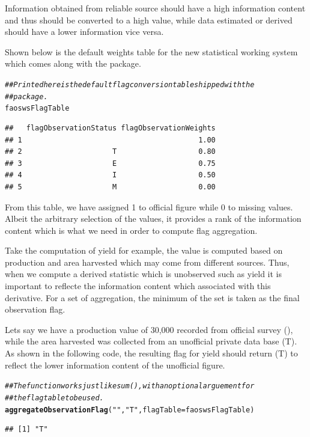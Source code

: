 \documentclass[nojss]{jss}\usepackage[]{graphicx}\usepackage[]{color}
\makeatletter
\newcommand{\hlstr}[1]{\textcolor[rgb]{0.192,0.494,0.8}{#1}}%
\newcommand{\hlcom}[1]{\textcolor[rgb]{0.678,0.584,0.686}{\textit{#1}}}%
\newcommand{\hlstd}[1]{\textcolor[rgb]{0.345,0.345,0.345}{#1}}%
\newcommand{\hlkwc}[1]{\textcolor[rgb]{0.333,0.667,0.333}{#1}}%
\newcommand{\hlkwd}[1]{\textcolor[rgb]{0.737,0.353,0.396}{\textbf{#1}}}%
\newenvironment{kframe}{%
 \def\at@end@of@kframe{}%
 \ifinner\ifhmode%
  \def\at@end@of@kframe{\end{minipage}}%
  \begin{minipage}{\columnwidth}%
 \fi\fi%
 \def\FrameCommand##1{\hskip\@totalleftmargin \hskip-\fboxsep
 \colorbox{shadecolor}{##1}\hskip-\fboxsep
     \hskip-\linewidth \hskip-\@totalleftmargin \hskip\columnwidth}%
 \MakeFramed {\advance\hsize-\width
   \@totalleftmargin\z@ \linewidth\hsize
   \@setminipage}}%
 {\par\unskip\endMakeFramed%
 \at@end@of@kframe}
\newenvironment{knitrout}{}{} %
\makeatother
\begin{document}
Information obtained from reliable source should have a high
information content and thus should be converted to a high value,
while data estimated or derived should have a lower information vice
versa.

Shown below is the default weights table for the new statistical
working system which comes along with the package.

\begin{knitrout}
\color{fgcolor}\begin{kframe}
\begin{alltt}
\hlcom{## Printed here is the default flag conversion table shipped with the}
\hlcom{## package.}
\hlstd{faoswsFlagTable}
\end{alltt}
\begin{verbatim}
##   flagObservationStatus flagObservationWeights
## 1                                         1.00
## 2                     T                   0.80
## 3                     E                   0.75
## 4                     I                   0.50
## 5                     M                   0.00
\end{verbatim}
\end{kframe}
\end{knitrout}

From this table, we have assigned 1 to official figure while 0 to
missing values. Albeit the arbitrary selection of the values, it
provides a rank of the information content which is what we need in
order to compute flag aggregation.

Take the computation of yield for example, the value is computed based
on production and area harvested which may come from different
sources. Thus, when we compute a derived statistic which is unobserved
such as yield it is important to reflecte the information content
which associated with this derivative. For a set of aggregation, the
minimum of the set is taken as the final observation flag.

Lets say we have a production value of 30,000 recorded from official
survey (), while the area harvested was collected from an unofficial
private data base (T). As shown in the following code, the resulting
flag for yield should return (T) to reflect the lower information
content of the unofficial figure.


\begin{knitrout}
\color{fgcolor}\begin{kframe}
\begin{alltt}
\hlcom{## The function works just like sum(), with an optional arguement for}
\hlcom{## the flag table to be used.}
\hlkwd{aggregateObservationFlag}\hlstd{(}\hlstr{""}\hlstd{,} \hlstr{"T"}\hlstd{,} \hlkwc{flagTable} \hlstd{= faoswsFlagTable)}
\end{alltt}
\begin{verbatim}
## [1] "T"
\end{verbatim}
\end{kframe}
\end{knitrout}
\end{document}
